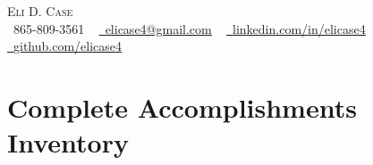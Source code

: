 \documentclass[letterpaper,11pt]{article}
\begin{document}
\begin{center}
    {\large \scshape Eli D. Case} \\ \vspace{1pt}
    \small \raisebox{-0.1\height}\faPhone\ 865-809-3561 ~ \href{mailto:elicase4@gmail.com}{\raisebox{-0.2\height}\faEnvelope\  \underline{elicase4@gmail.com}} ~ 
    \href{https://linkedin.com/in/elicase4}{\raisebox{-0.2\height}\faLinkedin\ \underline{linkedin.com/in/elicase4}}  ~
    \href{https://github.com/elicase4}{\raisebox{-0.2\height}\faGithub\ \underline{github.com/elicase4}}
    \vspace{-4pt}
\end{center}

\section{Complete Accomplishments Inventory}
  \vspace{2pt} 
\end{document}
